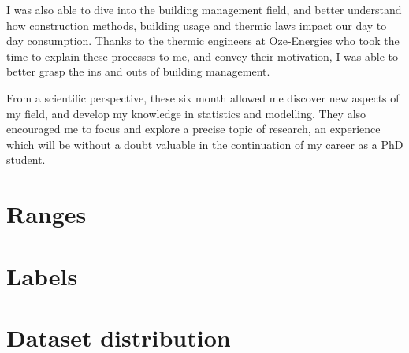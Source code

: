 \documentclass[12pt]{article}
\begin{document}
I was also able to dive into the building management field, and better understand how construction methods, building usage and thermic laws impact our day to day consumption. Thanks to the thermic engineers at Oze-Energies who took the time to explain these processes to me, and convey their motivation, I was able to better grasp the ins and outs of building management.

From a scientific perspective, these six month allowed me discover new aspects of my field, and develop my knowledge in statistics and modelling. They also encouraged me to focus and explore a precise topic of research, an experience which will be without a doubt valuable in the continuation of my career as a PhD student.



\clearpage
\appendix

\section{Ranges}


\section{Labels}


\section{Dataset distribution}

\end{document}
